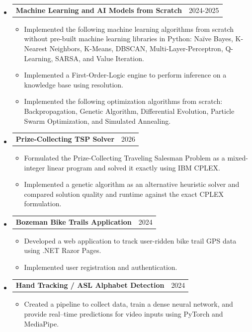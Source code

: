 \documentclass[letterpaper,11pt]{article}
\makeatletter
\newcommand{\resumeItem}[1]{
    \item\small{#1 \vspace{-2pt}}
}
\newcommand{\resumeProjectHeading}[2]{
    \item
    \begin{tabular*}{0.97\textwidth}{l@{\extracolsep{\fill}}r}
    \small#1 & #2 \\
    \end{tabular*}\vspace{-5pt}
}
\newcommand{\resumeSubHeadingListStart}{\begin{itemize}[leftmargin=0.15in, label={}]}
\newcommand{\resumeSubHeadingListEnd}{\end{itemize}}
\newcommand{\resumeItemListStart}{\begin{itemize}}
\newcommand{\resumeItemListEnd}{\end{itemize}\vspace{-5pt}}
\makeatother
\begin{document}
    \resumeSubHeadingListStart

    \resumeProjectHeading
    {\textbf{Machine Learning and AI Models from Scratch}}{2024-2025}
    \resumeItemListStart
    \resumeItem{Implemented the following machine learning algorithms from scratch without pre-built machine learning libraries in Python: Naïve Bayes, K-Nearest Neighbors, K-Means, DBSCAN, Multi-Layer-Perceptron, Q-Learning, SARSA, and Value Iteration.}
    \resumeItem{Implemented a First-Order-Logic engine to perform inference on a knowledge base using resolution.}
    \resumeItem{Implemented the following optimization algorithms from scratch: Backpropagation, Genetic Algorithm, Differential Evolution, Particle Swarm Optimization, and Simulated Annealing.}
    \resumeItemListEnd

    \resumeProjectHeading
    {\textbf{Prize-Collecting TSP Solver}}{2026}
    \resumeItemListStart
    \resumeItem{Formulated the Prize-Collecting Traveling Salesman Problem as a mixed-integer linear program and solved it exactly using IBM CPLEX.}
    \resumeItem{Implemented a genetic algorithm as an alternative heuristic solver and compared solution quality and runtime against the exact CPLEX formulation.}
    \resumeItemListEnd

    \resumeProjectHeading
    {\textbf{Bozeman Bike Trails Application}}{2024}
    \resumeItemListStart
    \resumeItem{Developed a web application to track user-ridden bike trail GPS data using .NET Razor Pages.}
    \resumeItem{Implemented user registration and authentication.}
    \resumeItemListEnd

    \resumeProjectHeading
    {\textbf{Hand Tracking / ASL Alphabet Detection}}{2024}
    \resumeItemListStart
    \resumeItem{Created a pipeline to collect data, train a dense neural network, and provide real--time predictions for video inputs using PyTorch and MediaPipe.}
    \resumeItemListEnd
    \resumeSubHeadingListEnd



\end{document}
